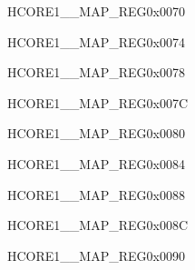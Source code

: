 \begin{register}{H}{CORE1\_\_MAP\_REG}{0x0070}\label{regdesc:CORE1I2S1INTMAPREG}
\end{register}\vspace{-3em}


\begin{register}{H}{CORE1\_\_MAP\_REG}{0x0074}\label{regdesc:CORE1I2S2INTMAPREG}
\end{register}\vspace{-3em}


\begin{register}{H}{CORE1\_\_MAP\_REG}{0x0078}\label{regdesc:CORE1UHCI0INTMAPREG}
\end{register}\vspace{-3em}


\begin{register}{H}{CORE1\_\_MAP\_REG}{0x007C}\label{regdesc:CORE1UART0INTMAPREG}
\end{register}\vspace{-3em}


\begin{register}{H}{CORE1\_\_MAP\_REG}{0x0080}\label{regdesc:CORE1UART1INTMAPREG}
\end{register}\vspace{-3em}


\begin{register}{H}{CORE1\_\_MAP\_REG}{0x0084}\label{regdesc:CORE1UART2INTMAPREG}
\end{register}\vspace{-3em}


\begin{register}{H}{CORE1\_\_MAP\_REG}{0x0088}\label{regdesc:CORE1UART3INTMAPREG}
\end{register}\vspace{-3em}


\begin{register}{H}{CORE1\_\_MAP\_REG}{0x008C}\label{regdesc:CORE1UART4INTMAPREG}
\end{register}\vspace{-3em}


\begin{register}{H}{CORE1\_\_MAP\_REG}{0x0090}\label{regdesc:CORE1LCDCAMINTMAPREG}
\end{register}\vspace{-3em}


